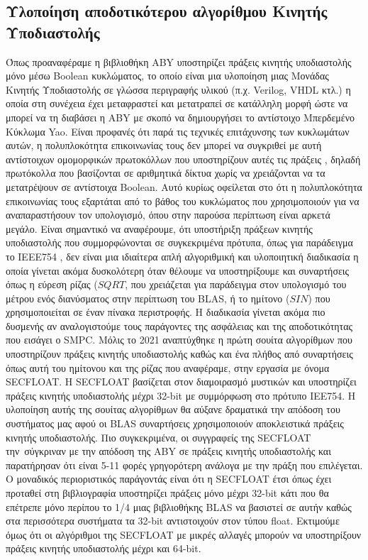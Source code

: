 \subsection{Υλοποίηση αποδοτικότερου αλγορίθμου Κινητής Υποδιαστολής}
Όπως προαναφέραμε η βιβλιοθήκη ABY υποστηρίζει πράξεις κινητής υποδιαστολής μόνο μέσω Boolean κυκλώματος, το οποίο είναι μια υλοποίηση μιας Μονάδας Κινητής Υποδιαστολής σε γλώσσα περιγραφής υλικού (π.χ. Verilog, VHDL κτλ.) η οποία στη συνέχεια έχει μεταφραστεί και μετατραπεί σε κατάλληλη μορφή ώστε να μπορεί να τη διαβάσει η ABY με σκοπό να δημιουργήσει το αντίστοιχο Μπερδεμένο Κύκλωμα Yao. Είναι προφανές ότι παρά τις τεχνικές επιτάχυνσης των κυκλωμάτων αυτών, η πολυπλοκότητα επικοινωνίας τους δεν μπορεί να συγκριθεί με αυτή αντίστοιχων ομομορφικών πρωτοκόλλων που υποστηρίζουν αυτές τις πράξεις \cite{cryptoeprint:2022/322} \cite{alxd1}, δηλαδή πρωτόκολλα που βασίζονται σε αριθμητικά δίκτυα χωρίς να χρειάζονται να τα μετατρέψουν σε αντίστοιχα Boolean. Αυτό κυρίως οφείλεται στο ότι η πολυπλοκότητα επικοινωνίας τους εξαρτάται από το βάθος του κυκλώματος που χρησιμοποιούν για να αναπαραστήσουν τον υπολογισμό, όπου στην παρούσα περίπτωση είναι αρκετά μεγάλο. Είναι σημαντικό να αναφέρουμε, ότι υποστήριξη πράξεων κινητής υποδιαστολής που συμμορφώνονται σε συγκεκριμένα πρότυπα, όπως για παράδειγμα το IEEE754 \cite{microprocessor2019754}, δεν είναι μια ιδιαίτερα απλή αλγοριθμική και υλοποιητική διαδικασία \cite{10.5555/1096483} η οποία γίνεται ακόμα δυσκολότερη όταν θέλουμε να υποστηρίξουμε και συναρτήσεις όπως η εύρεση ρίζας ($SQRT$, που χρειάζεται για παράδειγμα στον υπολογισμό του μέτρου ενός διανύσματος στην περίπτωση του BLAS, ή το ημίτονο ($SIN$) που χρησιμοποιείται σε έναν πίνακα περιστροφής. Η διαδικασία γίνεται ακόμα πιο δυσμενής αν αναλογιστούμε τους παράγοντες της ασφάλειας και της αποδοτικότητας που εισάγει ο SMPC. Μόλις το 2021 αναπτύχθηκε η πρώτη σουίτα αλγορίθμων που υποστηρίζουν πράξεις κινητής υποδιαστολής καθώς και ένα πλήθος από συναρτήσεις όπως αυτή του ημίτονου και της ρίζας που αναφέραμε, στην εργασία \cite{cryptoeprint:2022/322} με όνομα SECFLOAT. Η SECFLOAT βασίζεται στον διαμοιρασμό μυστικών και υποστηρίζει πράξεις κινητής υποδιαστολής μέχρι 32-bit με συμμόρφωση στο πρότυπο IEE754. Η υλοποίηση αυτής της σουίτας αλγορίθμων θα αύξανε δραματικά την απόδοση του συστήματος μας αφού οι BLAS συναρτήσεις χρησιμοποιούν αποκλειστικά πράξεις κινητής υποδιαστολής. Πιο συγκεκριμένα, οι συγγραφείς της SECFLOAT την\ σύγκριναν με την απόδοση της ABY σε πράξεις κινητής υποδιαστολής και παρατήρησαν ότι είναι 5-11 φορές γρηγορότερη ανάλογα με την πράξη που επιλέγεται. Ο μοναδικός περιοριστικός παράγοντάς είναι ότι η SECFLOAT έτσι όπως έχει προταθεί στη βιβλιογραφία υποστηρίζει πράξεις μόνο μέχρι 32-bit κάτι που θα επέτρεπε μόνο περίπου το 1/4 μιας βιβλιοθήκης BLAS να βασιστεί σε αυτήν καθώς στα περισσότερα συστήματα τα 32-bit αντιστοιχούν στον τύπου float. Εκτιμούμε όμως ότι οι αλγόριθμοι της SECFLOAT με μικρές αλλαγές μπορούν να υποστηρίξουν πράξεις κινητής υποδιαστολής μέχρι και 64-bit.

